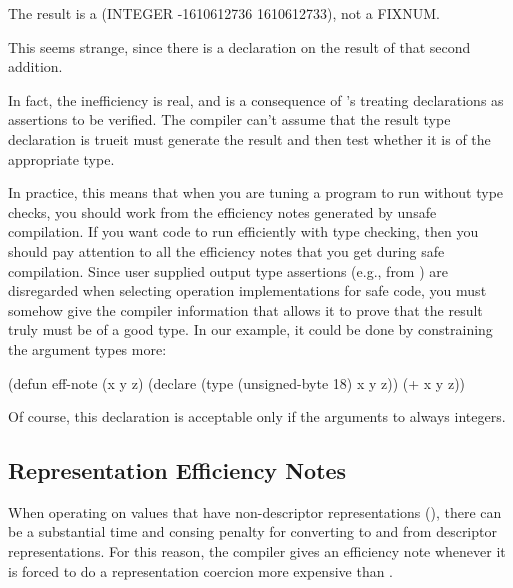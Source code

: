 \begin{example}
The result is a (INTEGER -1610612736 1610612733), not a FIXNUM.
\end{example}

This seems strange, since there is a  declaration on the result of that
second addition.

In fact, the inefficiency is real, and is a consequence of \python{}'s
treating declarations as assertions to be verified.  The compiler
can't assume that the result type declaration is true\dash{}it must
generate the result and then test whether it is of the appropriate
type.

In practice, this means that when you are tuning a program to run
without type checks, you should work from the efficiency notes
generated by unsafe compilation.  If you want code to run efficiently
with type checking, then you should pay attention to all the
efficiency notes that you get during safe compilation.  Since user
supplied output type assertions (e.g., from ) are
disregarded when selecting operation implementations for safe code,
you must somehow give the compiler information that allows it to prove
that the result truly must be of a good type.  In our example, it
could be done by constraining the argument types more:

\begin{lisp}
(defun eff-note (x y z)
  (declare (type (unsigned-byte 18) x y z))
  (+ x y z))
\end{lisp}

Of course, this declaration is acceptable only if the arguments to 
always   integers.


\subsection{Representation Efficiency Notes}
\label{representation-eff-note}

When operating on values that have non-descriptor representations
(), there can be a substantial time and consing
penalty for converting to and from descriptor representations.  For
this reason, the compiler gives an efficiency note whenever it is
forced to do a representation coercion more expensive than
.


